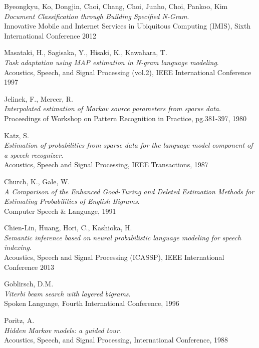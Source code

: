 \begin{thebibliography}{99}
  {\sc Byeongkyu,} Ko, {\sc Dongjin,} Choi, {\sc Chang,} Choi, {\sc Junho,} Choi, {\sc Pankoo,} Kim\\
  \emph{Document Classification through Building Specified N-Gram}.\\
  Innovative Mobile and Internet Services in Ubiquitous Computing (IMIS), Sixth International Conference 2012

  {\sc Masataki,} H., {\sc Sagisaka,} Y., {\sc Hisaki,} K., {\sc Kawahara,} T.\\
  \emph{Task adaptation using MAP estimation in N-gram language modeling}.\\
  Acoustics, Speech, and Signal Processing (vol.2), IEEE International Conference 1997

  {\sc Jelinek,} F., {\sc Mercer,} R.\\
  \emph{Interpolated estimation of Markov source parameters from sparse data}.\\
  Proceedings of Workshop on Pattern Recognition in Practice, pg.381-397, 1980

  {\sc Katz,} S.\\
  \emph{Estimation of probabilities from sparse data for the language model component of a speech recognizer}.\\
  Acoustics, Speech and Signal Processing, IEEE Transactions, 1987

  {\sc Church,} K., {\sc Gale,} W.\\
  \emph{A Comparison of the Enhanced Good-Turing and Deleted Estimation Methods for Estimating Probabilities of English Bigrams}.\\
  Computer Speech \& Language, 1991

  {\sc Chien-Lin,} Huang, {\sc Hori,} C., {\sc Kashioka,} H.\\
  \emph{Semantic inference based on neural probabilistic language modeling for speech indexing}.\\
  Acoustics, Speech and Signal Processing (ICASSP), IEEE International Conference 2013

  {\sc Goblirsch,} D.M.\\
  \emph{Viterbi beam search with layered bigrams}.\\
  Spoken Language, Fourth International Conference, 1996

  {\sc Poritz,} A.\\
  \emph{Hidden Markov models: a guided tour}.\\
  Acoustics, Speech, and Signal Processing, International Conference, 1988


\end{thebibliography}
